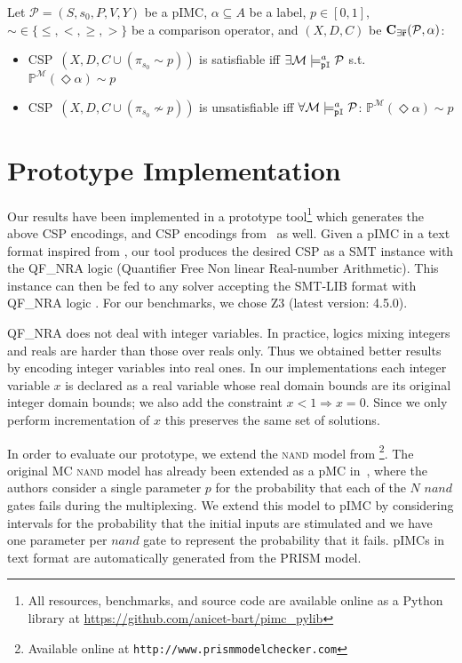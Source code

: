 \documentclass{llncs}
\newcommand{\mc}{\textnormal{MC}}
\newcommand{\pimc}{\textnormal{pIMC}}
\newcommand{\pmc}{\textnormal{pMC}}
\newcommand{\csp}{\textnormal{CSP}}
\newcommand{\satisfactionPimc}{\ensuremath{\models^a_{\tt{pI}}}}
\newcommand{\MerExt}{\ensuremath{{\bf C_{{\exists}\bar{r}}}}}
\newcommand{\bench}[1]    {\textnormal{\textsc{#1}}}
\newcommand{\Proba}            {\ensuremath{\mathbb{P}}}
\newcommand{\ltlExists}{\ensuremath{\Diamond}}
\begin{document}
    
\begin{theorem}\label{thm:pimc_reachability_in_cp}
	Let $\mathcal{P} = (S, s_0 , P, V, Y)$ be a \pimc,
	$\alpha \subseteq A$ be a label,
	$p \in [0, 1]$,
    ${\sim} \in \{\leq,<, \geq,>\}$ be a comparison operator,
    and $(X,D,C)$ be $\MerExt(\mathcal{P}, \alpha)$:
    \vspace*{-0.05cm}
    \begin{itemize}
    	\item 
			\csp\ $(X,D,C \cup (\pi_{s_0} \sim p))$
    		is satisfiable iff 
    		$\exists \mathcal{M} \satisfactionPimc \mathcal{P}$ s.t. $\Proba^\mathcal{M}(\ltlExists \alpha) \sim p$
   		\item
			\csp\ $(X,D,C \cup (\pi_{s_0} \not\sim p))$
    		is unsatisfiable iff 
    		$\forall \mathcal{M} \satisfactionPimc \mathcal{P}$: $\Proba^\mathcal{M}(\ltlExists \alpha) \sim p$
	\end{itemize}
\end{theorem}


\section{Prototype Implementation}

Our results have been implemented in a prototype tool\footnote{All
  resources, benchmarks, and source code  are
  available online as a Python library at \url{https://github.com/anicet-bart/pimc_pylib}}
which generates  the above CSP encodings, and
CSP encodings from~\cite{DelahayeLP16} as well. Given a {\pimc} in a text
format inspired from \cite{tulip},
our tool produces the desired {\csp} as a SMT instance with the QF\_NRA logic (Quantifier Free Non linear Real-number
Arithmetic). This instance can then be fed to any
solver accepting the SMT-LIB format with QF\_NRA logic \cite{BarFT-SMTLIB}. For our
benchmarks, we chose Z3 \cite{Z3}  (latest version: 4.5.0).

QF\_NRA does not deal with integer variables. In practice,
logics mixing integers and reals are harder than those over reals only. Thus we obtained better results by encoding integer
variables into real ones. In our implementations each integer variable $x$ is declared as a real variable whose real domain bounds are its original integer domain bounds; we also add the constraint $x < 1 \Rightarrow x = 0$. Since we only perform incrementation of $x$ this preserves the  same set of solutions. 

In order to evaluate our prototype, we extend the 
\bench{nand} model from \cite{NPKS05}\footnote{Available online at
  \texttt{http://www.prismmodelchecker.com}}. The original {\mc}
\bench{nand} model has already been extended as a {\pmc}
in~\cite{Prophesy}, where the authors consider a single parameter $p$
for the probability that each of the $N$ $nand$ gates fails during the
multiplexing. We extend this model to {\pimc} by considering intervals
for the probability that the initial inputs are stimulated and we
have one parameter per $nand$ gate to represent the
probability that it fails.  {\pimc}s in text format are
automatically generated from the PRISM model. 
\end{document}
